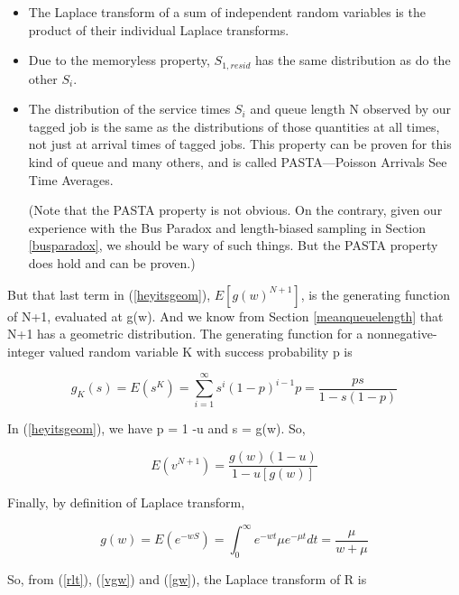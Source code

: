 \begin{itemize}

\item The Laplace transform of a sum of independent random variables is
the product of their individual Laplace transforms.

\item Due to the memoryless property, $S_{1,resid}$ has the same
distribution as do the other $S_{i}$.

\item The distribution of the service times $S_i$ and queue length N
observed by our tagged job is the same as the distributions of those
quantities at all times, not just at arrival times of tagged jobs.  This
property can be proven for this kind of queue and many others, and is
called PASTA---Poisson Arrivals See Time Averages.

(Note that the PASTA property is not obvious.  On the contrary, given
our experience with the Bus Paradox and length-biased sampling in
Section \ref{busparadox}, we should be wary of such things.  But the
PASTA property does hold and can be proven.)

\end{itemize}

But that last term in (\ref{heyitsgeom}), $E[g(w)^{N+1}]$, is the
generating function of N+1, evaluated at g(w).  And we know from Section
\ref{meanqueuelength} that N+1 has a geometric distribution.  The
generating function for a nonnegative-integer valued random variable K
with success probability p is

\begin{equation}
g_K(s) = E(s^K) = \sum_{i=1}^{\infty} s^i (1-p)^{i-1} p = 
\frac{ps}{1-s(1-p)}
\end{equation}

In (\ref{heyitsgeom}), we have p = 1 -u and s = g(w).  So,

\begin{equation}
\label{vgw}
E(v^{N+1}) =
\frac{g(w)(1-u)}{1-u[g(w)]}
\end{equation}

Finally, by definition of Laplace transform,

\begin{equation}
\label{gw}
g(w) = E(e^{-wS}) = \int_{0}^\infty e^{-wt} \mu e^{-\mu t} dt =
\frac{\mu }{w+\mu }
\end{equation}  

So, from (\ref{rlt}), (\ref{vgw}) and (\ref{gw}), the Laplace transform
of R is 

